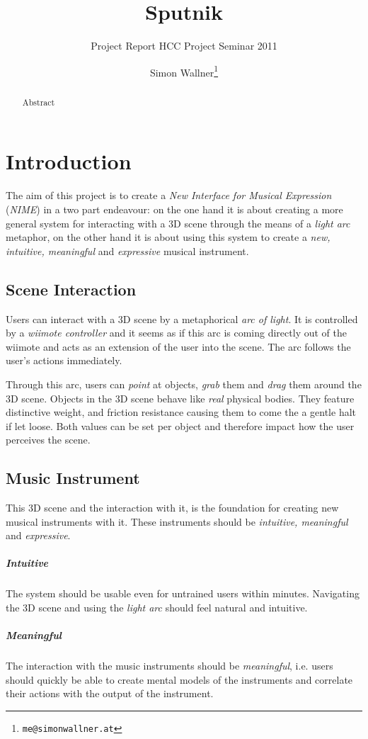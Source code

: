 \documentclass[10pt,a4paper]{scrartcl}
\title{Sputnik}
\subtitle{Project Report HCC Project Seminar 2011}
\author{Simon Wallner\footnote{\texttt{me@simonwallner.at}}}
\begin{document}
\maketitle

\begin{abstract}
Abstract
\end{abstract}

\section{Introduction}
The aim of this project is to create a \emph{New Interface for Musical Expression} (\emph{NIME}) in a two part endeavour: on the one hand it is about creating a more general system for interacting with a 3D scene through the means of a \emph{light arc} metaphor, on the other hand it is about using this system to create a \emph{new, intuitive, meaningful} and \emph{expressive} musical instrument.

\subsection{Scene Interaction}
Users can interact with a 3D scene by a metaphorical \emph{arc of light}. It is controlled by a \emph{wiimote controller} and it seems as if this arc is coming directly out of the wiimote and acts as an extension of the user into the scene. The arc follows the user's actions immediately. 

Through this arc, users can \emph{point} at objects, \emph{grab} them and \emph{drag} them around the 3D scene. Objects in the 3D scene behave like \emph{real} physical bodies. They feature distinctive weight, and friction resistance causing them to come the a gentle halt if let loose. Both values can be set per object and therefore impact how the user perceives the scene.


\subsection{Music Instrument}
This 3D scene and the interaction with it, is the foundation for creating new musical instruments with it. These instruments should be \emph{intuitive, meaningful} and \emph{ expressive}.

\subparagraph{Intuitive}
The system should be usable even for untrained users within minutes. Navigating the 3D scene and using the \emph{light arc} should feel natural and intuitive.

\subparagraph{Meaningful}
The interaction with the music instruments should be \emph{meaningful}, i.e. users should quickly be able to create mental models of the instruments and correlate their actions with the output of the instrument. 
\end{document}
